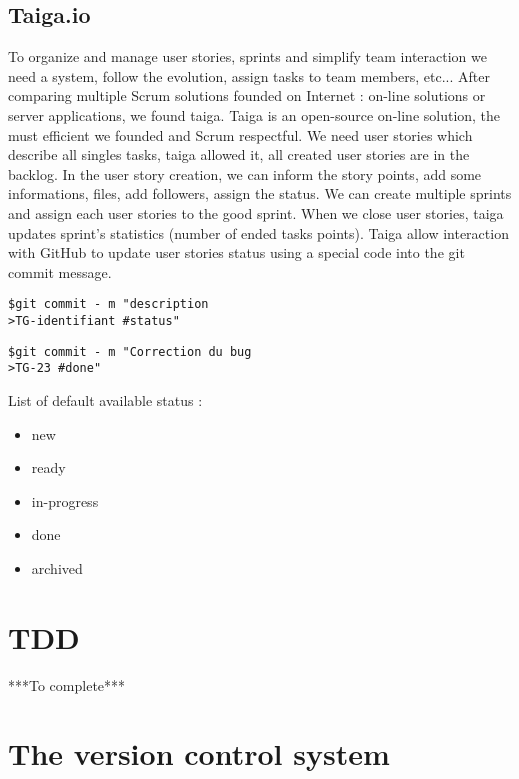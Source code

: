 \subsection{Taiga.io}

To organize and manage user stories, sprints and simplify team interaction we need a system, follow the evolution, assign tasks to team members, etc...
After comparing multiple Scrum solutions founded on Internet : on-line solutions or server applications, we found taiga.
Taiga is an open-source on-line solution, the must efficient we founded and Scrum respectful.
We need user stories which describe all singles tasks, taiga allowed it, all created user stories are in the backlog.
In the user story creation, we can inform the story points, add some informations, files, add followers, assign the status.
We can create multiple sprints and assign each user stories to the good sprint.
When we close user stories, taiga updates sprint's statistics (number of ended tasks points).
Taiga allow interaction with GitHub to update user stories status using a special code into the git commit message.

\begin{lstlisting}[frame=single, caption="The default syntax"]
$git commit - m "description
>TG-identifiant #status"
\end{lstlisting}

\begin{lstlisting}[frame=single, caption="For example mark the user story 23 to 'Done'"]
$git commit - m "Correction du bug
>TG-23 #done"
\end{lstlisting}

List of default available status : 
\begin{itemize}
	\item new
	\item ready
	\item in-progress
	\item done
	\item archived
\end{itemize}

\section{TDD}

***To complete***
			
\section{The version control system}

